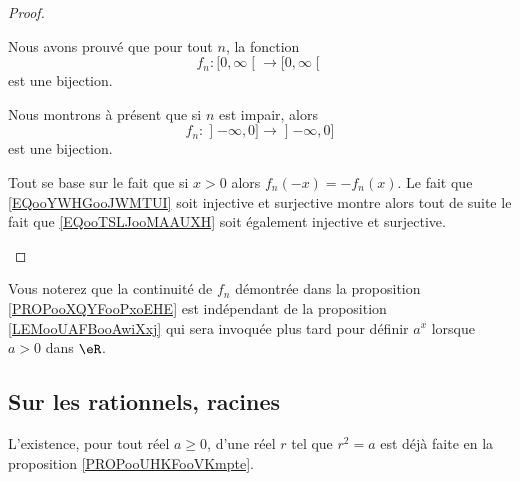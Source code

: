 \begin{proof}
\begin{subproof}
            Nous avons prouvé que pour tout \( n\), la fonction
            \begin{equation}        \label{EQooYWHGooJWMTUI}
                f_n\colon \mathopen[ 0 , \infty \mathclose[\to \mathopen[ 0 , \infty \mathclose[
            \end{equation}
            est une bijection.

        \item[Pour \( n\) impair]

            Nous montrons à présent que si \( n\) est impair, alors
            \begin{equation}        \label{EQooTSLJooMAAUXH}
                f_n\colon \mathopen] -\infty , 0 \mathclose]\to \mathopen] -\infty , 0 \mathclose]
            \end{equation}
            est une bijection.

            Tout se base sur le fait que si \( x>0\) alors \( f_n(-x)=-f_n(x)\). Le fait que \eqref{EQooYWHGooJWMTUI} soit injective et surjective montre alors tout de suite le fait que \eqref{EQooTSLJooMAAUXH} soit également injective et surjective.
    \end{subproof}
\end{proof}

Vous noterez que la continuité de \( f_n\) démontrée dans la proposition \ref{PROPooXQYFooPxoEHE} est indépendant de la proposition \ref{LEMooUAFBooAwiXxj} qui sera invoquée plus tard pour définir \( a^x\) lorsque \( a>0\) dans \( \eR\).

\subsection{Sur les rationnels, racines}

L'existence, pour tout réel \( a\geq 0\), d'une réel \( r\) tel que \( r^2=a\) est déjà faite en la proposition \ref{PROPooUHKFooVKmpte}.

